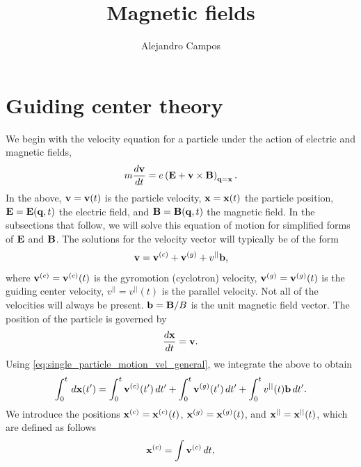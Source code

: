 \documentclass[a4paper,11pt]{report}
\title{Magnetic fields}
\author{Alejandro Campos}
\begin{document}
\maketitle
\tableofcontents

\chapter{Guiding center theory}
We begin with the velocity equation for a particle under the action of electric and magnetic fields, 
\begin{equation}
\label{eq:single_particle_motion}
    m \frac{d \mathbf{v}}{dt} = e \left ( \mathbf{E} + \mathbf{v} \times \mathbf{B} \right )_{\mathbf{q} = \mathbf{x}}.
\end{equation}
In the above, $\mathbf{v} = \mathbf{v}(t)$ is the particle velocity, $\mathbf{x} = \mathbf{x}(t)$ the particle position, $\mathbf{E} = \mathbf{E}(\mathbf{q},t)$ the electric field, and $\mathbf{B} = \mathbf{B}(\mathbf{q},t)$ the magnetic field. In the subsections that follow, we will solve this equation of motion for simplified forms of $\mathbf{E}$ and $\mathbf{B}$. The solutions for the velocity vector will typically be of the form
\begin{equation}
    \label{eq:single_particle_motion_vel_general}
    \mathbf{v} = \mathbf{v}^{(c)} + \mathbf{v}^{(g)} + v^{||} \mathbf{b},
\end{equation}
where $\mathbf{v}^{(c)} = \mathbf{v}^{(c)}(t)$ is the gyromotion (cyclotron) velocity, $\mathbf{v}^{(g)} = \mathbf{v}^{(g)}(t)$ is the guiding center velocity, $v^{||} = v^{||}(t)$ is the parallel velocity. Not all of the velocities will always be present. $\mathbf{b} = \mathbf{B} / B$ is the unit magnetic field vector. The position of the particle is governed by 
\begin{equation}
    \frac{d\mathbf{x}}{dt} = \mathbf{v}.
\end{equation}
Using \cref{eq:single_particle_motion_vel_general}, we integrate the above to obtain
\begin{equation}
    \label{eq:single_particle_motion_pos_eq_mod}
    \int_0^t \, d\mathbf{x}(t') = \int_0^t \mathbf{v}^{(c)}(t') \, dt' + \int_0^t \mathbf{v}^{(g)}(t') \, dt' + \int_0^t v^{||}(t) \mathbf{b} \, dt'.
\end{equation}
We introduce the positions $\mathbf{x}^{(c)} = \mathbf{x}^{(c)}(t)$, $\mathbf{x}^{(g)} = \mathbf{x}^{(g)}(t)$, and $\mathbf{x}^{||} = \mathbf{x}^{||}(t)$, which are defined as follows
\begin{equation}
    \mathbf{x}^{(c)} = \int \mathbf{v}^{(c)} \, dt,
\end{equation}
\end{document}
